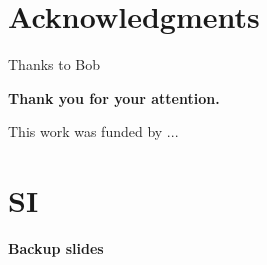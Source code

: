 \documentclass[compress]{beamer}
\begin{document}
\section*{Acknowledgments}
\begin{frame}

\small{
Thanks to Bob 
}


\begin{center}
\vspace{1cm}
\Large \textbf{Thank you for your attention.}
\vspace{5mm}
\end{center} 

\begin{flushright}
\begin{minipage}{0.45\linewidth}
This work was funded by ...
\end{minipage}
\end{flushright}

\end{frame}


\appendix

\begin{frame}
 
\begin{tiny}  
         
\end{tiny}
\end{frame}


\section{SI}

\begin{frame}
\label{SI1}

\textbf{Backup slides}

\end{frame}
\end{document}
